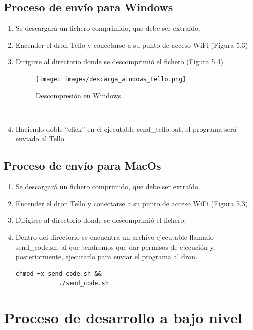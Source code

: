 \documentclass{report}
\begin{document}
\subsection{Proceso de envío para Windows}

\begin{enumerate}
	\item Se descargará un fichero comprimido, que debe ser extraído.
	\item Encender el dron Tello y conectarse a su punto de acceso WiFi (Figura 5.3)
	\item Dirigirse al directorio donde se descomprimió el fichero (Figura 5.4)
	\\
		\begin{figure}[h!]
 			 \centering
    			\texttt{[image: images/descarga\_windows\_tello.png]}
  			\caption{Descompresión en Windows}
  			\label{Descompresión en Windows}
		\end{figure}
	\\
	\item Haciendo doble “click” en el ejecutable send\_tello.bat, el programa será enviado al Tello.
\end{enumerate}

\subsection{Proceso de envío para MacOs}

\begin{enumerate}
	\item Se descargará un fichero comprimido, que debe ser extraído.
	\item Encender el dron Tello y conectarse a su punto de acceso WiFi (Figura 5.3).
	\item Dirigirse al directorio donde se descomprimió el fichero.
	\item Dentro del directorio se encuentra un archivo ejecutable llamado send\_code.sh, al que tendremos que dar permisos de ejecución y, posteriormente, ejecutarlo para enviar el programa al dron.
	\\
		\begin{lstlisting}[frame=single,breaklines=true, label="Comandos para ejecución del envío en Linux", caption="Comandos para ejecución del envío en MacOs",  captionpos=b]
			chmod +x send_code.sh &&
			./send_code.sh
		\end{lstlisting}
\end{enumerate}

\section{Proceso de desarrollo a bajo nivel}
\end{document}
